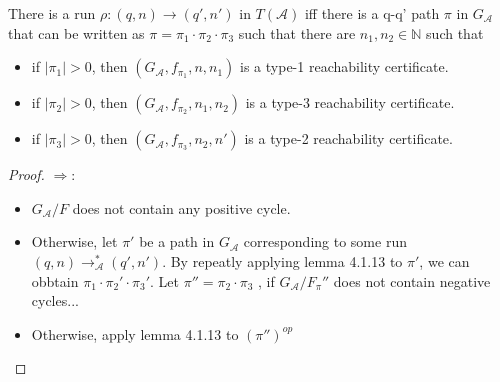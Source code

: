 \documentclass{beamer}
\begin{document}
\begin{frame}\begin{lemma}[4.1.14]
There is a run $\rho : (q, n) \rightarrow (q', n') $ in $T(\mathcal{A})$ iff there is a q-q' path $\pi$ in $G_\mathcal{A}$ that can be written as $\pi = \pi_1 \cdot \pi_2 \cdot \pi_3$ such that there are $n_1, n_2 \in \mathbb{N}$ such that 

                                                                                                 \begin{itemize}
\item if $|\pi_1| > 0$, then $(G_\mathcal{A}, f_{\pi_1}, n, n_1)$ is a type-1 reachability certificate. 
\item if $|\pi_2| > 0$, then $(G_\mathcal{A}, f_{\pi_2}, n_1, n_2)$ is a type-3 reachability certificate. 
\item if $|\pi_3| > 0$, then $(G_\mathcal{A}, f_{\pi_3}, n_2, n')$ is a type-2 reachability certificate. 
\end{itemize}

                                                                                                                                                                                      \end{lemma}
\begin{proof}
$\Rightarrow$:

\begin{itemize}
\item $G_\mathcal{A}/F$ does not contain any positive cycle.
\item Otherwise, let $\pi'$ be a path in $G_\mathcal{A}$ corresponding to some run $(q, n)\rightarrow^*_\mathcal{A} (q', n')$. By repeatly applying lemma 4.1.13 to $\pi'$, we can obbtain $\pi_1 \cdot \pi_2' \cdot \pi_3'$. Let $\pi'' = \pi_2 \cdot \pi_3$ , if $G_\mathcal{A}/F_\pi''$ does not contain negative cycles...
\item Otherwise, apply lemma 4.1.13 to $(\pi'')^{op}$
\end{itemize}
\end{proof}                                                                                                
                                                                                                 
                                                                                         
\end{frame}
\end{document}
